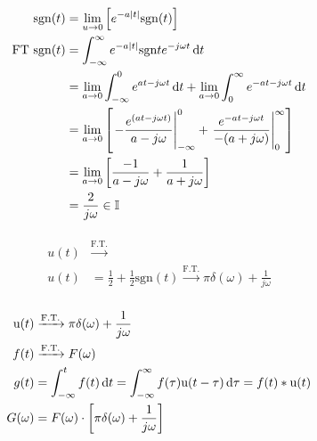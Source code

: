      \begin{align*}
     \mathrm{sgn}(t)&=\lim_{u\to0}\left[
     e^{-a|t|}\mathrm{sgn}(t)
     \right] \\
     \mathrm{ FT }\ \mathrm{sgn}(t) &=
     \int_{-\infty}^{\infty} e^{-a|t|}\mathrm{sgn}te^{-j\omega t}\dif t
     \\ &= \lim_{a\to0}\int_{-\infty}^{0} e^{at-j\omega t}\dif t
     + \lim_{a\to 0} \int_0^\infty e^{-at-j\omega t}\dif t
     \\ &=
     \lim_{a\to0}\left[ \left.-\frac{e^{(at-j\omega t)}}{a-j\omega }
     \right|_{-\infty}^0 + \left. \frac{e^{-at-j\omega t}}{-(a+j\omega )}
     \right|_0^\infty
      \right]
     \\ &= \lim_{a\to 0} \left[ \frac{-1}{a-j\omega }+\frac{1}{a+j\omega} \right]
     \\ &= \frac{2}{j\omega }\in\mathbb I
     \end{align*}
     
     \paragraph{}
     \begin{align*}
     u(t) &\xrightarrow{\text{F.T.}} \\
     u(t) &= \frac{1}{2}+\frac{1}{2}\mathrm{sgn}(t)
     \xrightarrow{\text{F.T.}} \pi\delta(\omega ) +\frac{1}{j\omega }
     \end{align*}
     
     
     \subsubsection{}     
     \begin{align*}
     \mathrm u(t) &\xrightarrow{\text{F.T.}} \pi\delta(\omega )+\frac{1}{j\omega }\\
     f(t) &\xrightarrow{\text{F.T.}} F(\omega ) \\
     g(t) &= \int_{-\infty}^{t}f(t)\dif t = \int_{-\infty}^{\infty} f(\tau)
     \mathrm u(t-\tau)\dif\tau = f(t)*\mathrm u(t) \\
     G(\omega ) &= F(\omega )\cdot\left[ \pi\delta(\omega )+\frac{1}{j\omega } \right]
     \end{align*}
     
